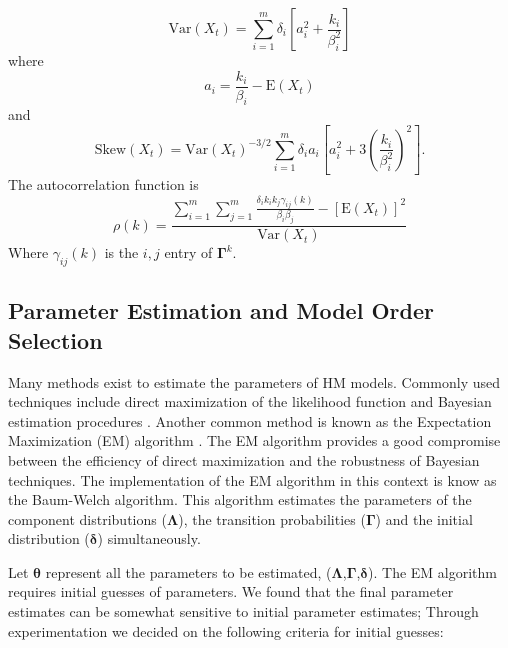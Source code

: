 \documentclass[wrr]{AGUTeX}
\begin{document}
\begin{article}
\begin{equation}
\mbox{Var}(X_t) = \displaystyle\sum_{i=1}^m\delta_i\left[a_i^2+\frac{k_i}{\beta_i^2}\right]
\end{equation}
%
where 
%
\begin{equation}
a_i = \frac{k_i}{\beta_i}-\mbox{E}(X_t)
\end{equation}
and
\begin{equation}
\mbox{Skew}(X_t) = \mbox{Var}(X_t)^{-3/2}\displaystyle\sum_{i=1}^m\delta_ia_i\left[a_i^2+3\left(\frac{k_i}{\beta_i^2}\right)^2\right].
\end{equation}
%
The autocorrelation function is
%
\begin{equation}
\rho(k) = \frac{\displaystyle\sum_{i=1}^m\displaystyle\sum_{j=1}^m\frac{\delta_ik_ik_j\gamma_{ij}(k)}{\beta_i\beta_j} - \left[\mbox{E}(X_t)\right]^2}{\mbox{Var}(X_t)}
\end{equation}
%
Where $\gamma_{ij}(k)$ is the $i,j$ entry of $\boldsymbol\Gamma^k$.


\subsection{Parameter Estimation and Model Order Selection}

Many methods exist to estimate the parameters of HM models.  Commonly used techniques include direct maximization of the likelihood function \citep{Zucchini:2009vl,Akntug:2005wx} and Bayesian estimation procedures \citep{Thyer:2000ud,Thyer:2003kr}.  Another common method is known as the Expectation Maximization (EM) algorithm \citep{Dempster1977}.  The EM algorithm provides a good compromise between the efficiency of direct maximization and the robustness of Bayesian techniques.  The implementation of the EM algorithm in this context is know as the Baum-Welch algorithm.  This algorithm estimates the parameters of the component distributions ($\boldsymbol\Lambda$), the transition probabilities ($\boldsymbol{\Gamma}$) and the initial distribution ($\boldsymbol\delta$) simultaneously.  

Let $\boldsymbol{\theta}$ represent all the parameters to be estimated, ($\boldsymbol{\Lambda}$,$\boldsymbol{\Gamma}$,$\boldsymbol\delta$).  The EM algorithm requires initial guesses of parameters.  We found that the final parameter estimates can be somewhat sensitive to initial parameter estimates; Through experimentation we decided on the following criteria for initial guesses:


\end{article}
\end{document}
